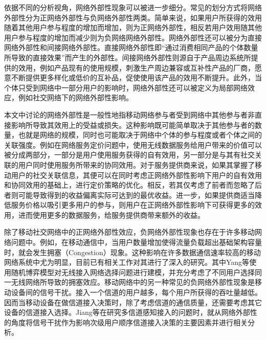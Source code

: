 
依据不同的分析视角，网络外部性现象可以被进一步细分。常见的划分方式将网络外部性分为正网络外部性与负网络外部性两类。简单来说，如果用户所获得的效用随着其他用户参与程度的增加而增加，则为正网络外部性，相反若用户效用随其他用户参与程度的增加而减少则为负网络网络外部性。网络外部性还可以被分为直接网络外部性和间接网络外部性。直接网络外部性即“通过消费相同产品的个体数量所导致的直接效果”而产生的外部性。间接网络外部性则源自于产品周边系统所提供的效用，例如产品现有的使用规模，刺激生产周边兼容或互补性产品的厂商，愿意不断提供更多样化或低价的互补品，促使使用该产品的效用不断提升。此外，当个体只受到网络中一部分用户的影响时，网络外部性还可以被定义为局部网络效应，例如社交网络下的网络外部性影响\cite{jianweibook}。

本文中讨论的网络外部性是一般性地指移动网络参与者受到网络中其他参与者非直接影响所导致其效用上的受益或损失。这种影响既可能简单取决于其他参与者的数量，也就是网络的规模，同时也可能取决于网络中个体的参与程度或者个体之间的关联强度\cite{externality}。例如在网络服务定价问题中，使用无线数据服务给用户带来的价值可以被分成两部分，一部分是用户使用服务获得的自有效用，另一部分是与其有社交关联的用户同时使用服务所带来的协同效用。对于服务提供商来说，如果其掌握了移动用户的社交关联信息，其便可以在同时考虑正网络外部性影响下用户的自有效用和协同效用的基础上，进行定价策略的优化。相反，若其仅考虑了前者而忽略了后者则可能导致得到的收益偏离实际可达到的最优收益。进一步，如果提供商适当降低服务价格以吸引更多用户的参与，则用户在正网络外部性影响下可获得更多的效用，进而使用更多的数据服务，给服务提供商带来额外的收益。

除了移动社交网络中的正网络外部性效应，负网络外部性现象也存在于许多移动网络问题中。例如，在移动通信中，当用户数量增加使得流量负载超出基础架构容量时，就会发生拥塞（Congestion）现象。这种影响在许多数据通信速率较高的移动网络系统中尤为明显，目前已有相关工作对其进行了深入的研究\cite{Asuman07,Fang09,Tran12,rayliu2,rayliu3}。其中Yang等\cite{rayliu2}使用随机博弈模型对无线接入网络选择问题进行建模，并充分考虑了不同用户选择同一无线网络所导致的拥塞效应。移动网络中的另一种常见的负网络外部性现象是移动设备间的信号干扰。接入一个信道的用户越多，每个用户所获得的吞吐量越低。因而当移动设备在做信道接入决策时，除了考虑信道的通信质量，还需要考虑其它设备的信道接入选择。Jiang等\cite{rayliu1}在研究多信道感知接入的问题时，就从网络外部性的角度将信号干扰作为影响次级用户顺序信道接入决策的主要因素并进行相关分析。

